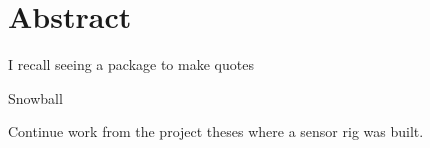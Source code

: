 \chapter*{Abstract}
\epigraph{I recall seeing a package to make quotes}{Snowball}
Continue work from the project theses where a sensor rig was built.

